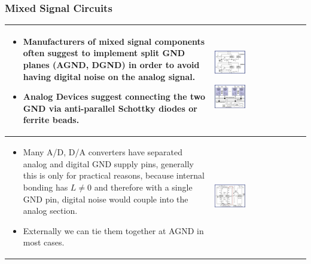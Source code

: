 		\subsubsection{Mixed Signal Circuits}
				\begin{table}[h!]
				\centering
				\begin{tabular}{|m{}|m{}|}
					\hline
						\begin{itemize}
							\item Manufacturers of mixed signal components often suggest to implement split GND planes (AGND, DGND) in order to avoid having digital noise on the analog signal. 
							\item Analog Devices suggest connecting the two GND via anti-parallel Schottky diodes or ferrite beads. 
						\end{itemize}
					& 
						 \begin{center}\includegraphics[width=0.35\textwidth]{images/AGND_DGND.png}\end{center}  
						 \begin{center}\includegraphics[width=0.35\textwidth]{images/Schottky.png}\end{center}		
					\\
					\hline
						\begin{itemize}
							\item Many A/D, D/A converters have separated analog and digital GND supply pins, generally this is only for practical reasons, because internal bonding has $L \neq 0$ and therefore with a single GND pin, digital noise would couple into the analog section. 
							\item Externally we can tie them together at AGND in most cases.  
						\end{itemize}
					& 
						 \begin{center}\includegraphics[width=0.35\textwidth]{images/MixedSignal1.png}\end{center}  		
					\\
					\hline
					\end{tabular}
				\end{table}	
				
